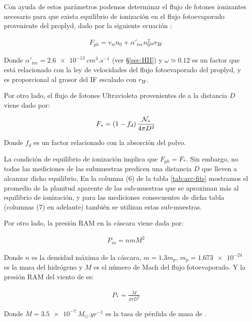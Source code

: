 Con ayuda de estos parámetros podemos determinar el flujo de fotones ionizantes necesario para que exista equilibrio de ionización en el flujo fotoevaporado proveniente del proplyd, dado por la siguiente ecuación \citep{Henney:2001}:

\begin{align}
  F_{ph} = v_w n_0 + \alpha'_{\mathrm{rec}}n^2_0 \omega r_{\mathrm{IF}}\label{eq:F-ph}
\end{align}

Donde $\alpha'_{\mathrm{rec}} = \SI{2.6e-13}{cm^3.s^{-1}}$ (ver \S \ref{sec:HII}) y $\omega \simeq 0.12$ es un factor que está relacionado con la ley de velocidades del flujo fotoevaporado del proplyd, y es proporcional al grosor del IF escalado con $r_{\mathrm{IF}}$.

Por otro lado, el flujo de fotones Ultravioleta provenientes de \thC{} a la distancia $D$ viene dado por:

\begin{align}
  F_* = \left(1 - f_d\right)\frac{\mathcal{N}_*}{4\pi D^2} \label{eq:F-star}
\end{align}

Donde $f_d$ es un factor relacionado con la absorción del polvo.

La condición de equilibrio de ionización implica que $F_{ph} = F_*$. Sin embargo, no todas las mediciones de las submuestras predicen una distancia $D$ que lleven a alcanzar dicho equilibrio. En la columna (6) de la tabla \ref{tab:arc-fits} mostramos el promedio de la planitud aparente de las sub-muestras que se aproximan más al equilibrio de ionización, y para las mediciones consecuentes de dicha tabla (columnas (7) en adelante) también se utilizan estas sub-muestras.

Por otro lado, la presión RAM en la cáscara viene dada por:

\begin{align}
  P_{in} = n m M^2 \label{eq:P-in}
\end{align}

Donde $n$ es la densidad máxima de la cáscara, $m = 1.3 m_p$, $m_p = \SI{1.673e-24}{}$ es la masa del hidrógeno y $M$ es el número de Mach del flujo fotoevaporado. Y la presión RAM del viento de \thC{} es:

\begin{align}
  P_* = \frac{\dot{M}}{4\pi D^2} \label{eq:P-star}
\end{align}

Donde $\dot{M} = \SI{3.5e-7}{M_\odot.yr^{-1}}$ es la tasa de pérdida de masa de \thC{}.


